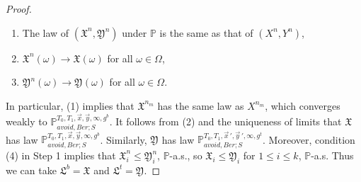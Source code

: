 \begin{proof}
\begin{enumerate}[label=(\arabic*)]
		\item The law of $(\mathfrak{X}^n,\mathfrak{Y}^n)$ under $\mathbb{P}$ is the same as that of $(X^n,Y^n)$,
		
		\item $\mathfrak{X}^n(\omega) \longrightarrow \mathfrak{X}(\omega)$ for all $\omega\in\Omega$,
		
		\item $\mathfrak{Y}^n(\omega) \longrightarrow \mathfrak{Y}(\omega)$ for all $\omega\in\Omega$.
		
	\end{enumerate}
	
	In particular, (1) implies that $\mathfrak{X}^{n_m}$ has the same law as $X^{n_m}$, which converges weakly to $\mathbb{P}_{avoid,Ber;S}^{T_0,T_1,\vec{x},\vec{y},\infty,g^b}$. It follows from (2) and the uniqueness of limits that $\mathfrak{X}$ has law $\mathbb{P}_{avoid,Ber;S}^{T_0,T_1,\vec{x},\vec{y},\infty,g^b}$. Similarly, $\mathfrak{Y}$ has law $\mathbb{P}_{avoid,Ber;S}^{T_0,T_1,\vec{x}\,',\vec{y}\,',\infty,g^t}$. Moreover, condition (4) in Step 1 implies that $\mathfrak{X}^n_i \leq \mathfrak{Y}^n_i$, $\mathbb{P}$-a.s., so $\mathfrak{X}_i \leq \mathfrak{Y}_i$ for $1\leq i\leq k$, $\mathbb{P}$-a.s. Thus we can take $\mathfrak{L}^b = \mathfrak{X}$ and $\mathfrak{L}^t = \mathfrak{Y}$.
	
\end{proof}
